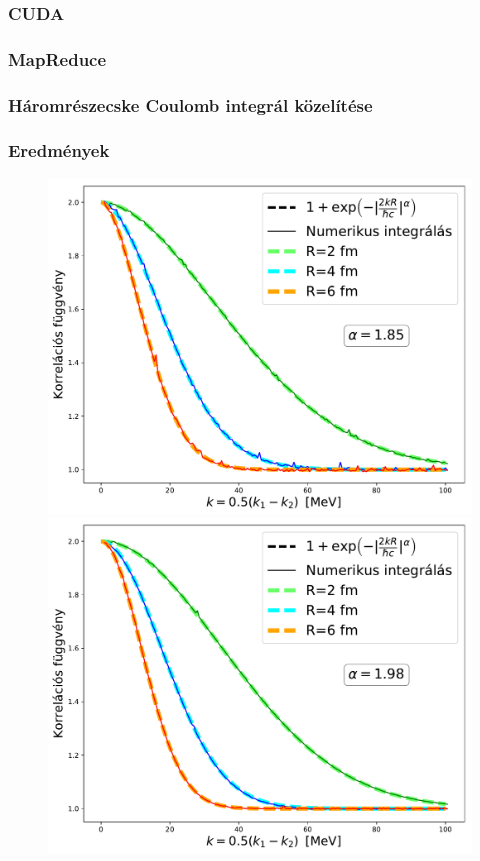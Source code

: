 \documentclass[10pt,a4paper]{article}
\numberwithin{equation}{subsection}
\numberwithin{figure}{section}
\begin{document}
\subsubsection{CUDA}\label{sec:CUDA}
\subsubsection{MapReduce}\label{sec:MapReduce}
\subsubsection{Háromrészecske Coulomb integrál közelítése}

\subsubsection{Eredmények}
\begin{figure}[H]
\centering
\includegraphics[scale=0.36]{pic/Coulomb/C2_noCoulomb_R246_a185.pdf}
\includegraphics[scale=0.36]{pic/Coulomb/C2_noCoulomb_R246_a198.pdf}
\end{figure}
\end{document}

